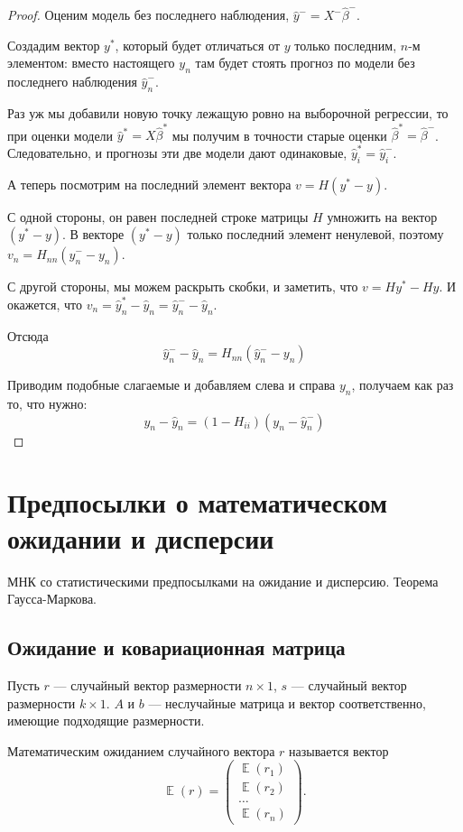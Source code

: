 \documentclass[12pt]{article}
\DeclareMathOperator{\E}{\mathbb{E}}
\begin{document}
\begin{proof}
Оценим модель без последнего наблюдения, $\hat y^{-} = X^{-} \hat\beta^{-}$. 

Создадим вектор $y^{*}$, который будет отличаться от $y$ только последним, $n$-м элементом:
вместо настоящего $y_n$ там будет стоять прогноз по модели без последнего наблюдения $\hat y^{-}_n$.

Раз уж мы добавили новую точку лежащую ровно на выборочной регрессии, то при оценки модели
$\hat y^* = X \hat \beta^*$ мы получим в точности старые оценки $\hat \beta^* = \hat \beta^-$. 
Следовательно, и прогнозы эти две модели дают одинаковые, $\hat y_i^* = \hat y_i^-$.

А теперь посмотрим на последний элемент вектора $v = H (y^* - y)$.

С одной стороны, он равен последней строке матрицы $H$ умножить на вектор $(y^* - y)$. 
В векторе $(y^* - y)$ только последний элемент ненулевой, поэтому $v_n = H_{nn} (\hat y^{-}_n - y_n)$.

С другой стороны, мы можем раскрыть скобки, и заметить, что $v = Hy^* - Hy$. 
И окажется, что $v_n = \hat y_n^* - \hat y_n = \hat y_n^- - \hat y_n$.

Отсюда
\[
 \hat y_n^- - \hat y_n = H_{nn} (\hat y_n^- - y_n)
\]

Приводим подобные слагаемые и добавляем слева и справа $y_n$, получаем как раз то, что нужно:
\[
y_n - \hat y_n   = (1 - H_{ii}) (y_n - \hat y_n^- )
\]
\end{proof}




\section{Предпосылки о математическом ожидании и дисперсии}
МНК со статистическими предпосылками на ожидание и дисперсию. Теорема Гаусса-Маркова.



\subsection{Ожидание и ковариационная матрица }

Пусть $r$ --- случайный вектор размерности $n \times 1$, $s$ --- случайный вектор размерности $k \times 1$. $A$ и $b$ --- неслучайные матрица и вектор соответственно, имеющие подходящие размерности.

Математическим ожиданием случайного вектора $r$ называется вектор
\[
\E(r) = \begin{pmatrix}
	\E(r_1)  \\
	\E(r_2)  \\
        \dots \\
        \E(r_n)
      \end{pmatrix}.
\]
\end{document}
